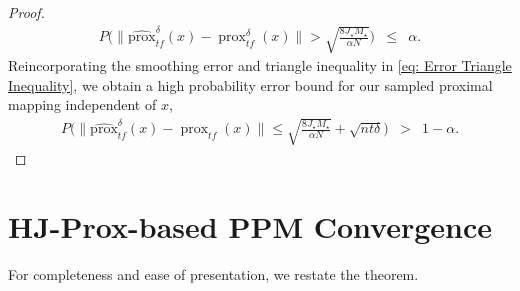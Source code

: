 \documentclass{article}
\newcommand{\sampledhjprox}{\operatorname{\widehat{prox}}^{\delta}}
\newcommand{\prox}{\operatorname{prox}}
\newcommand{\hjprox}{\operatorname{prox}^{\delta}}
\theoremstyle{plain}
\theoremstyle{definition}
\theoremstyle{remark}
\begin{document}
\begin{proof}
\begin{eqnarray} \label{eq: Borel Cantelli Formulation}
    P\Big(\| \sampledhjprox_{tf}(x) - \hjprox_{tf}(x)\| > \sqrt{\frac{8J_\star M_\star}{\alpha N}}\Big) &\leq& \alpha.
\end{eqnarray}
Reincorporating the smoothing error and triangle inequality in \ref{eq: Error Triangle Inequality}, we obtain a  high probability error bound for our sampled proximal mapping independent of $x$, 
\begin{eqnarray}
    P\Big(\| \sampledhjprox_{tf}(x) - \prox_{tf}(x)\| \leq \sqrt{\frac{8J_\star M_\star}{\alpha N}} + \sqrt{nt\delta}\Big) &>& 1- \alpha .
\end{eqnarray}
\end{proof}
\section{HJ-Prox-based PPM Convergence}
For completeness and ease of presentation, we restate the theorem.
\end{document}
